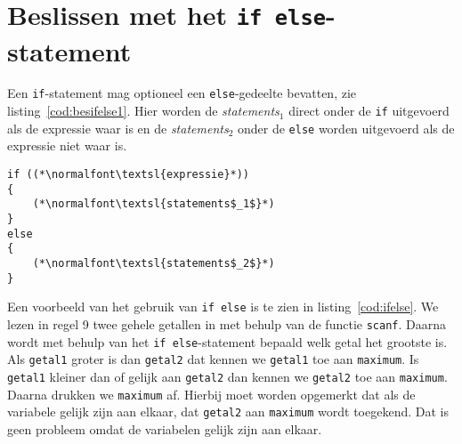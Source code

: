 \section{Beslissen met het \texttt{if else}-statement}
Een \texttt{if}-statement mag optioneel een \texttt{else}-gedeelte bevatten, zie listing~\ref{cod:besifelse1}. Hier worden de \textsl{statements}$_1$ direct onder de \texttt{if} uitgevoerd als de expressie waar is en de \textsl{statements}$_2$ onder de \texttt{else} worden uitgevoerd als de expressie niet waar is.

\begin{lstlisting}[caption=Algemene opzet van het \texttt{if else}-statement.,label=cod:besifelse1]
if ((*\normalfont\textsl{expressie}*))
{
    (*\normalfont\textsl{statements$_1$}*)
}
else
{
    (*\normalfont\textsl{statements$_2$}*)
}
\end{lstlisting}

Een voorbeeld van het gebruik van \texttt{if else} is te zien in listing~\ref{cod:ifelse}. We lezen in regel 9 twee gehele getallen in met behulp van de functie \texttt{scanf}. Daarna wordt met behulp van het \texttt{if else}-statement bepaald welk getal het grootste is. Als \texttt{getal1} groter is dan \texttt{getal2} dat kennen we \texttt{getal1} toe aan \texttt{maximum}. Is \texttt{getal1} kleiner dan of gelijk aan \texttt{getal2} dan kennen we \texttt{getal2} toe aan \texttt{maximum}. Daarna drukken we \texttt{maximum} af. Hierbij moet worden opgemerkt dat als de variabele gelijk zijn aan elkaar, dat \texttt{getal2} aan \texttt{maximum} wordt toegekend. Dat is geen probleem omdat de variabelen gelijk zijn aan elkaar.


%
%
%
%
%
%



